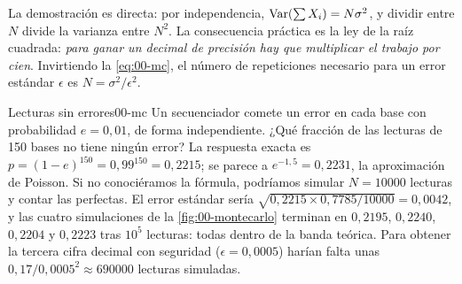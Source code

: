 La demostración es directa: por independencia, $\operatorname{Var}(\sum X_i)=N\sigma^2$, y dividir entre $N$ divide la varianza entre $N^2$. La consecuencia práctica es la ley de la raíz cuadrada: \emph{para ganar un decimal de precisión hay que multiplicar el trabajo por cien}. Invirtiendo la \cref{eq:00-mc}, el número de repeticiones necesario para un error estándar $\epsilon$ es $N=\sigma^2/\epsilon^2$.

\begin{ejemplo}{Lecturas sin errores}{00-mc}
Un secuenciador comete un error en cada base con probabilidad $e=0{,}01$, de forma independiente. ¿Qué fracción de las lecturas de 150 bases no tiene ningún error? La respuesta exacta es $p=(1-e)^{150}=0{,}99^{150}=0{,}2215$; se parece a $e^{-1{,}5}=0{,}2231$, la aproximación de Poisson. Si no conociéramos la fórmula, podríamos simular $N=\num{10000}$ lecturas y contar las perfectas. El error estándar sería $\sqrt{0{,}2215\times0{,}7785/\num{10000}}=0{,}0042$, y las cuatro simulaciones de la \cref{fig:00-montecarlo} terminan en $0{,}2195$, $0{,}2240$, $0{,}2204$ y $0{,}2223$ tras $10^5$ lecturas: todas dentro de la banda teórica. Para obtener la tercera cifra decimal con seguridad ($\epsilon=0{,}0005$) harían falta unas $0{,}17/0{,}0005^2\approx\num{690000}$ lecturas simuladas.
\end{ejemplo}

